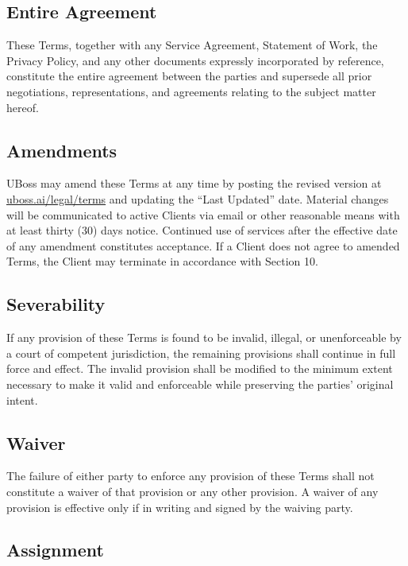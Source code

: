 \documentclass[11pt,letterpaper,parskip=half]{scrartcl}
\begin{document}
\subsection{Entire Agreement}

These Terms, together with any Service Agreement, Statement of Work, the Privacy Policy, and any other documents expressly incorporated by reference, constitute the entire agreement between the parties and supersede all prior negotiations, representations, and agreements relating to the subject matter hereof.

\subsection{Amendments}

UBoss may amend these Terms at any time by posting the revised version at \href{https://uboss.ai/en/legal/terms}{uboss.ai/legal/terms} and updating the ``Last Updated'' date. Material changes will be communicated to active Clients via email or other reasonable means with at least thirty (30) days notice. Continued use of services after the effective date of any amendment constitutes acceptance. If a Client does not agree to amended Terms, the Client may terminate in accordance with Section 10.

\subsection{Severability}

If any provision of these Terms is found to be invalid, illegal, or unenforceable by a court of competent jurisdiction, the remaining provisions shall continue in full force and effect. The invalid provision shall be modified to the minimum extent necessary to make it valid and enforceable while preserving the parties' original intent.

\subsection{Waiver}

The failure of either party to enforce any provision of these Terms shall not constitute a waiver of that provision or any other provision. A waiver of any provision is effective only if in writing and signed by the waiving party.

\subsection{Assignment}
\end{document}
